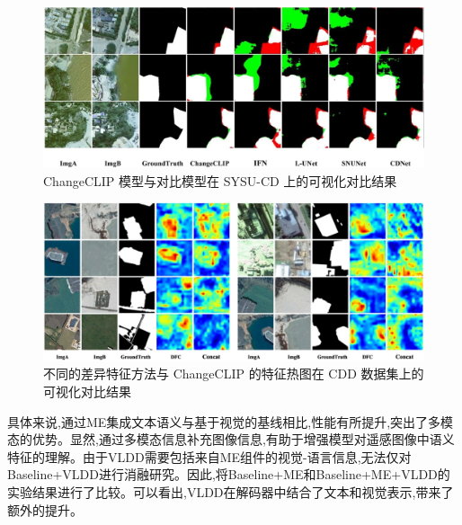 \begin{figure}[!htbp]
  \centering
  \includegraphics[width=\textwidth]{paper_figures/基于AI基础模型微调的变化检测模型研究/ChangeCLIP/changeclip_sysu.png}
  \caption{ChangeCLIP 模型与对比模型在 SYSU-CD 上的可视化对比结果}
  \label{fig:changeclip_sysu}
\end{figure}

\begin{figure}[!htbp]
  \centering
  \includegraphics[width=\textwidth]{paper_figures/基于AI基础模型微调的变化检测模型研究/ChangeCLIP/changeclip_hotmap.png}
  \caption{不同的差异特征方法与 ChangeCLIP 的特征热图在 CDD 数据集上的可视化对比结果}
  \label{fig:changeclip_hotmap}
\end{figure}

具体来说,通过ME集成文本语义与基于视觉的基线相比,性能有所提升,突出了多模态的优势。显然,通过多模态信息补充图像信息,有助于增强模型对遥感图像中语义特征的理解。由于VLDD需要包括来自ME组件的视觉-语言信息,无法仅对Baseline+VLDD进行消融研究。因此,将Baseline+ME和Baseline+ME+VLDD的实验结果进行了比较。可以看出,VLDD在解码器中结合了文本和视觉表示,带来了额外的提升。

